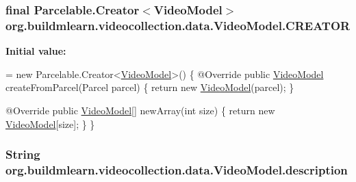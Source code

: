 \subsubsection[{\texorpdfstring{C\+R\+E\+A\+T\+OR}{CREATOR}}]{\setlength{\rightskip}{0pt plus 5cm}final Parcelable.\+Creator$<${\bf Video\+Model}$>$ org.\+buildmlearn.\+videocollection.\+data.\+Video\+Model.\+C\+R\+E\+A\+T\+OR}\hypertarget{classorg_1_1buildmlearn_1_1videocollection_1_1data_1_1VideoModel_a221472985206d46cac0d7dc5541fc58b}{}\label{classorg_1_1buildmlearn_1_1videocollection_1_1data_1_1VideoModel_a221472985206d46cac0d7dc5541fc58b}
{\bfseries Initial value\+:}
\begin{DoxyCode}
= \textcolor{keyword}{new} Parcelable.Creator<\hyperlink{classorg_1_1buildmlearn_1_1videocollection_1_1data_1_1VideoModel_a4efb22b0c91242d1f2e9e283d0cc309f}{VideoModel}>() \{
        @Override
        \textcolor{keyword}{public} \hyperlink{classorg_1_1buildmlearn_1_1videocollection_1_1data_1_1VideoModel_a4efb22b0c91242d1f2e9e283d0cc309f}{VideoModel} createFromParcel(Parcel parcel) \{
            \textcolor{keywordflow}{return} \textcolor{keyword}{new} \hyperlink{classorg_1_1buildmlearn_1_1videocollection_1_1data_1_1VideoModel_a4efb22b0c91242d1f2e9e283d0cc309f}{VideoModel}(parcel);
        \}

        @Override
        \textcolor{keyword}{public} \hyperlink{classorg_1_1buildmlearn_1_1videocollection_1_1data_1_1VideoModel_a4efb22b0c91242d1f2e9e283d0cc309f}{VideoModel}[] newArray(\textcolor{keywordtype}{int} size) \{
            \textcolor{keywordflow}{return} \textcolor{keyword}{new} \hyperlink{classorg_1_1buildmlearn_1_1videocollection_1_1data_1_1VideoModel_a4efb22b0c91242d1f2e9e283d0cc309f}{VideoModel}[size];
        \}
    \}
\end{DoxyCode}
\subsubsection[{\texorpdfstring{description}{description}}]{\setlength{\rightskip}{0pt plus 5cm}String org.\+buildmlearn.\+videocollection.\+data.\+Video\+Model.\+description\hspace{0.3cm}{\ttfamily [private]}}\hypertarget{classorg_1_1buildmlearn_1_1videocollection_1_1data_1_1VideoModel_a46c463c496e66a09acc123535f17fbec}{}\label{classorg_1_1buildmlearn_1_1videocollection_1_1data_1_1VideoModel_a46c463c496e66a09acc123535f17fbec}
